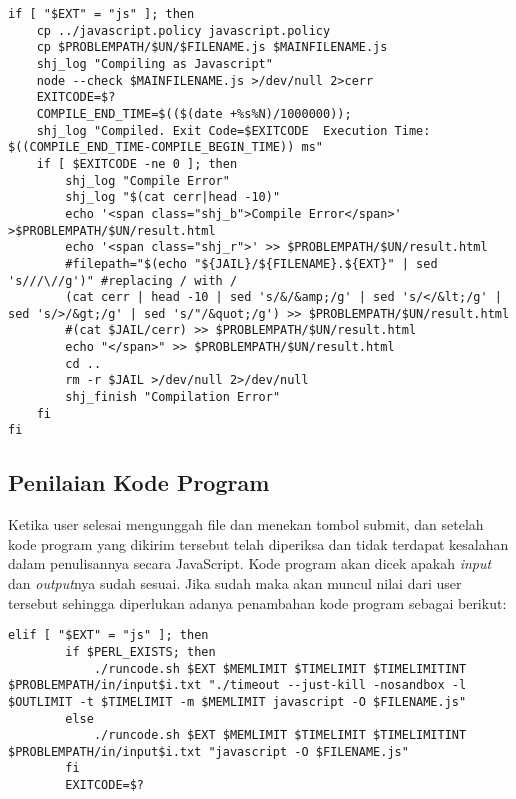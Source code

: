 \begin{itemize}
    \begin{lstlisting}[basicstyle=\ttfamily, frame=single,
    columns=fullflexible, breaklines=true, numbers=none]
if [ "$EXT" = "js" ]; then
    cp ../javascript.policy javascript.policy
    cp $PROBLEMPATH/$UN/$FILENAME.js $MAINFILENAME.js
    shj_log "Compiling as Javascript"
    node --check $MAINFILENAME.js >/dev/null 2>cerr 
    EXITCODE=$?
    COMPILE_END_TIME=$(($(date +%s%N)/1000000));
    shj_log "Compiled. Exit Code=$EXITCODE  Execution Time: $((COMPILE_END_TIME-COMPILE_BEGIN_TIME)) ms"
    if [ $EXITCODE -ne 0 ]; then
        shj_log "Compile Error"
        shj_log "$(cat cerr|head -10)"
        echo '<span class="shj_b">Compile Error</span>' >$PROBLEMPATH/$UN/result.html
        echo '<span class="shj_r">' >> $PROBLEMPATH/$UN/result.html
        #filepath="$(echo "${JAIL}/${FILENAME}.${EXT}" | sed 's///\//g')" #replacing / with /
        (cat cerr | head -10 | sed 's/&/&amp;/g' | sed 's/</&lt;/g' | sed 's/>/&gt;/g' | sed 's/"/&quot;/g') >> $PROBLEMPATH/$UN/result.html
        #(cat $JAIL/cerr) >> $PROBLEMPATH/$UN/result.html
        echo "</span>" >> $PROBLEMPATH/$UN/result.html
        cd ..
        rm -r $JAIL >/dev/null 2>/dev/null
        shj_finish "Compilation Error"
    fi
fi
    \end{lstlisting}
     \subsection{Penilaian Kode Program}
     Ketika user selesai mengunggah file dan menekan tombol submit, dan setelah kode program yang dikirim tersebut telah diperiksa dan tidak terdapat kesalahan dalam penulisannya secara JavaScript. Kode program akan dicek apakah \textit{input} dan \textit{output}nya sudah sesuai. Jika sudah maka akan muncul nilai dari user tersebut sehingga diperlukan adanya penambahan kode program sebagai berikut: 
     
    \begin{lstlisting}[basicstyle=\ttfamily, frame=single,
    columns=fullflexible, breaklines=true, numbers=none]
elif [ "$EXT" = "js" ]; then
        if $PERL_EXISTS; then
            ./runcode.sh $EXT $MEMLIMIT $TIMELIMIT $TIMELIMITINT $PROBLEMPATH/in/input$i.txt "./timeout --just-kill -nosandbox -l $OUTLIMIT -t $TIMELIMIT -m $MEMLIMIT javascript -O $FILENAME.js"
        else
            ./runcode.sh $EXT $MEMLIMIT $TIMELIMIT $TIMELIMITINT $PROBLEMPATH/in/input$i.txt "javascript -O $FILENAME.js"
        fi
        EXITCODE=$?
    \end{lstlisting}
 \end{itemize}